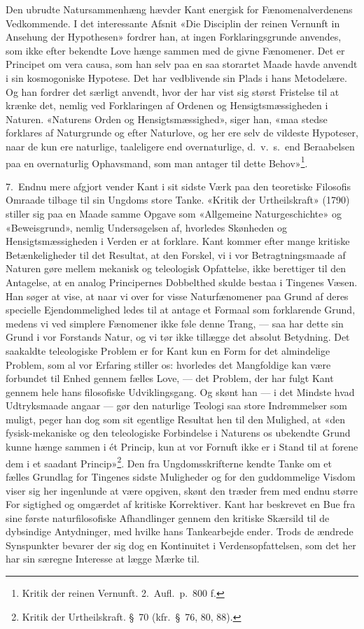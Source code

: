 \documentclass[12pt,a4paper]{article}
\newcommand{\opage}[1]{\marginnote{\footnotesize\textit{[#1]}}}
\begin{document}
Den ubrudte Natursammenhæng hævder Kant energisk for Fænomenalverdenens
Vedkommende. I det interessante Afsnit «Die Disciplin der reinen Vernunft
in Ansehung der Hypothesen» fordrer han, at ingen Forklaringsgrunde
anvendes, som ikke efter bekendte Love hænge sammen med de givne
Fænomener. Det er Principet om vera causa, som han selv paa en
saa storartet Maade havde anvendt i sin kosmogoniske Hypotese. Det har
vedblivende sin Plads i hans Metodelære. Og han fordrer det særligt
anvendt, hvor der har vist sig størst Fristelse til at krænke det, nemlig
ved Forklaringen af Ordenen og Hensigtsmæssigheden i Naturen. «Naturens
Orden og Hensigtsmæssighed», siger han, «maa stedse forklares af
Naturgrunde og efter Naturlove, og her ere selv de vildeste Hypoteser,
naar de kun ere naturlige, taaleligere end overnaturlige, d.\ v.\ s.\ end
Beraabelsen paa en overnaturlig Ophavsmand, som man antager til dette
Behov»\footnote{Kritik der reinen Vernunft. 2.\ Aufl.\ p.\ 800 f.}.

7.\ Endnu mere afgjort vender Kant i sit sidste Værk paa den teoretiske
Filosofis Omraade tilbage til sin Ungdoms store Tanke. «Kritik der
Urtheilskraft» (1790) stiller sig paa en Maade samme Opgave som
«Allgemeine Naturgeschichte» og «Beweisgrund», nemlig Undersøgelsen af,
hvorledes Skønheden og Hensigtsmæssigheden i Verden er at forklare. Kant
kommer efter mange kritiske Betænkeligheder til det Resultat, at den
Forskel, vi i vor Betragtningsmaade af Naturen gøre mellem mekanisk og
teleologisk Opfattelse, ikke berettiger til den Antagelse, at en analog
Principernes Dobbelthed skulde bestaa i Tingenes Væsen. Han søger at vise,
at naar vi over for visse Naturfænomener paa Grund af deres specielle
Ejendommelighed ledes til at antage et Formaal som forklarende Grund,
medens vi ved simplere Fænomener ikke føle denne Trang, --- saa har dette
sin Grund i vor Forstands Natur, og vi tør ikke tillægge det absolut
Betydning. Det saakaldte teleologiske Problem er for Kant kun en Form for
det almindelige Problem, som al vor Erfaring stiller os: hvorledes det
Mangfoldige kan være forbundet til Enhed gennem fælles Love, --- det
Problem, der har fulgt Kant gennem hele hans filosofiske Udviklingsgang.
Og skønt han --- i det Mindste hvad Udtryksmaade angaar --- gør den
naturlige Teologi saa store Indrømmelser som muligt, peger han dog som
sit egentlige Resultat hen til den Mulighed, at «den fysisk-mekaniske og
den teleologiske Forbindelse i Naturens os ubekendte Grund kunne hænge
sammen i ét Princip, kun at vor Fornuft ikke er i Stand til at forene dem
i et saadant Princip»\footnote{Kritik der Urtheilskraft. §\ 70
(kfr.\ §\ 76, 80, 88).}. Den fra Ungdomsskrifterne kendte Tanke om et
fælles Grundlag for Tingenes sidste Muligheder og for den guddommelige
Visdom viser sig her ingenlunde at være opgiven, skønt den træder frem
med endnu større For%
\opage{18}sigtighed og omgærdet af kritiske Korrektiver. Kant har beskrevet en Bue fra
sine første naturfilosofiske Afhandlinger gennem den kritiske Skærsild
til de dybsindige Antydninger, med hvilke hans Tankearbejde ender. Trods
de ændrede Synspunkter bevarer der sig dog en Kontinuitet i
Verdensopfattelsen, som det her har sin særegne Interesse at lægge Mærke
til.
\end{document}
